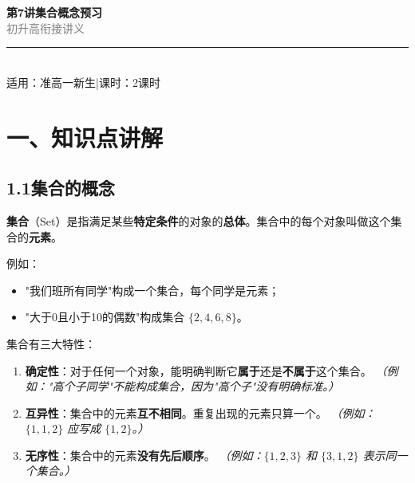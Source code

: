 \documentclass[12pt, a4paper]{ctexart}
\begin{document}
\begin{center}
{\Huge\bfseries\textcolor{mainblue}{第7讲\quad 集合概念预习}}\\[12pt]
{\Large\textcolor{gray}{初升高衔接讲义}}\\[8pt]
\rule{0.6\textwidth}{1pt}\\[8pt]
{\normalsize 适用：准高一新生\quad |\quad 课时：2课时}
\end{center}
\vspace{10pt}

\section*{\textcolor{mainblue}{一、知识点讲解}}

\subsection*{1.1\quad 集合的概念}

\begin{knowledgebox}[什么是集合]
\textbf{集合}（Set）是指满足某些\textbf{特定条件}的对象的\textbf{总体}。集合中的每个对象叫做这个集合的\textbf{元素}。

例如：
\begin{itemize}[leftmargin=2em]
  \item "我们班所有同学"构成一个集合，每个同学是元素；
  \item "大于0且小于10的偶数"构成集合 $\{2,4,6,8\}$。
\end{itemize}
\end{knowledgebox}

集合有三大特性：

\begin{enumerate}[leftmargin=2.5em]
  \item \textbf{确定性}：对于任何一个对象，能明确判断它\textbf{属于}还是\textbf{不属于}这个集合。
        \quad\textit{（例如："高个子同学"不能构成集合，因为"高个子"没有明确标准。）}
  \item \textbf{互异性}：集合中的元素\textbf{互不相同}。重复出现的元素只算一个。
        \quad\textit{（例如：$\{1,1,2\}$ 应写成 $\{1,2\}$。）}
  \item \textbf{无序性}：集合中的元素\textbf{没有先后顺序}。
        \quad\textit{（例如：$\{1,2,3\}$ 和 $\{3,1,2\}$ 表示同一个集合。）}
\end{enumerate}
\end{document}

